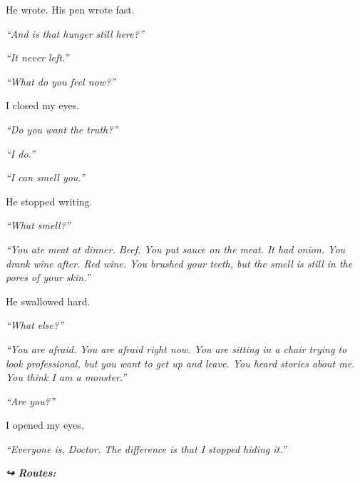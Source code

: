\noindent He wrote. His pen wrote fast.

\noindent \textit{\textquotedblleft{}And is that hunger still here?\textquotedblright{}}

\noindent \textit{\textquotedblleft{}It never left.\textquotedblright{}}

\noindent \textit{\textquotedblleft{}What do you feel now?\textquotedblright{}}

\noindent I closed my eyes.

\noindent \textit{\textquotedblleft{}Do you want the truth?\textquotedblright{}}

\noindent \textit{\textquotedblleft{}I do.\textquotedblright{}}

\noindent \textit{\textquotedblleft{}I can smell you.\textquotedblright{}}

\noindent He stopped writing.

\noindent \textit{\textquotedblleft{}What smell?\textquotedblright{}}

\noindent \textit{\textquotedblleft{}You ate meat at dinner. Beef. You put sauce on the meat. It had onion. You drank wine after. Red wine. You brushed your teeth, but the smell is still in the pores of your skin.\textquotedblright{}}

\noindent He swallowed hard.

\noindent \textit{\textquotedblleft{}What else?\textquotedblright{}}

\noindent \textit{\textquotedblleft{}You are afraid. You are afraid right now. You are sitting in a chair trying to look professional, but you want to get up and leave. You heard stories about me. You think I am a monster.\textquotedblright{}}

\noindent \textit{\textquotedblleft{}Are you?\textquotedblright{}}

\noindent I opened my eyes.

\noindent \textit{\textquotedblleft{}Everyone is, Doctor. The difference is that I stopped hiding it.\textquotedblright{}}

\vspace{0.5em}
\noindent\textit{\textbf{↪ Routes:}  \rotasep {} \rotasep {}}
